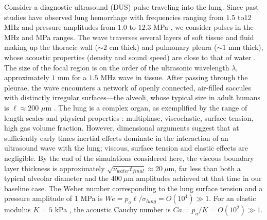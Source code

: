 \documentclass{jfm}%
\newcommand{\orderof}[1]{\ensuremath{\textit{O}\left(#1\right)}}
\begin{document}
Consider a diagnostic ultrasound (DUS) pulse traveling into the
lung. Since past studies have observed lung hemorrhage with
frequencies ranging from $1.5$ to$12$ MHz and pressure amplitudes from
$1.0$ to $12.3$ MPa
\citep{Penney1993a,Child1990,OBrien2000b,Miller2015a}, we consider
pulses in the MHz and MPa ranges.  The wave traverses several layers
of soft tissue and fluid making up the thoracic wall ($\sim 2$ cm
thick) and pulmonary pleura ($\sim 1$ mm thick), whose acoustic
properties (density and sound speed) are close to that of water
\citep{McLean2011}.  The size of the focal region is on the order of
the ultrasonic wavelength $\lambda$, approximately $1$ mm for a $1.5$
MHz wave in tissue.  After passing through the pleurae, the wave
encounters a network of openly connected, air-filled saccules with
distinctly irregular surfaces---the alveoli, whose typical size in
adult humans is $\ell\approx200$ $\mu$m \citep{Ochs2004}.  The lung is
a complex organ, as exemplified by the range of length scales and
physical properties \citep{Bayliss1939, Suki1994}: multiphase,
viscoelastic, surface tension, high gas volume fraction.  However,
dimensional arguments suggest that at sufficiently early times
inertial effects dominate in the interaction of an ultrasound wave
with the lung; viscous, surface tension and elastic effects are
negligible. By the end of the simulations considered here, the viscous
boundary layer thickness is approximately
$\sqrt{\nu_{water} t_{final}}\approx 20~\mu$m, far less than both a
typical alveolar diameter and the $400~\mu$m amplitudes achieved at
that time in our baseline case.  The Weber number corresponding to the
lung surface tension \cite[ $\sim 9$ mN/m,][]{Schurch1976} and a
pressure amplitude of 1 MPa is
$We=p_a\ell/\sigma_{lung}=\orderof{10^4}\gg1$. For an elastic modulus
$K = 5$ kPa \citep{Cavalcante2005}, the acoustic Cauchy number is
$Ca=p_a/K=\orderof{10^2}\gg1$.
\end{document}

